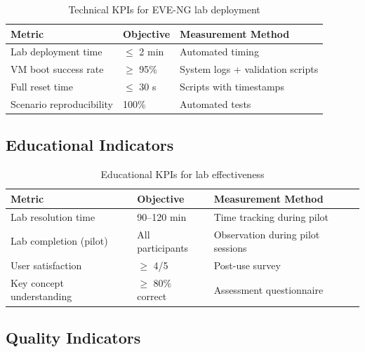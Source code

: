 \begin{table}[H]
  \centering
  \small
  \setlength{\tabcolsep}{4pt}
  \renewcommand{\arraystretch}{1.1}
  \begin{tabularx}{\textwidth}{l l X}
    \toprule
    \textbf{Metric} & \textbf{Objective} & \textbf{Measurement Method} \\
    \midrule
    Lab deployment time & $\leq$ 2 min & Automated timing \\
    \midrule
    VM boot success rate & $\geq$ 95\% & System logs + validation scripts \\
    \midrule
    Full reset time & $\leq$ 30 s & Scripts with timestamps \\
    \midrule
    Scenario reproducibility & 100\% & Automated tests \\
    \bottomrule
  \end{tabularx}
  \caption{Technical KPIs for EVE-NG lab deployment}
  \label{tab:kpi_technical_detail}
\end{table}

\subsection{Educational Indicators}

\begin{table}[H]
  \centering
  \small
  \setlength{\tabcolsep}{4pt}
  \renewcommand{\arraystretch}{1.1}
  \begin{tabularx}{\textwidth}{l l X}
    \toprule
    \textbf{Metric} & \textbf{Objective} & \textbf{Measurement Method} \\
    \midrule
    Lab resolution time & 90--120 min & Time tracking during pilot \\
    \midrule
    Lab completion (pilot) & All participants & Observation during pilot sessions \\
    \midrule
    User satisfaction & $\geq$ 4/5 & Post-use survey \\
    \midrule
    Key concept understanding & $\geq$ 80\% correct & Assessment questionnaire \\
    \bottomrule
  \end{tabularx}
  \caption{Educational KPIs for lab effectiveness}
  \label{tab:kpi_educational_detail}
\end{table}

\subsection{Quality Indicators}

